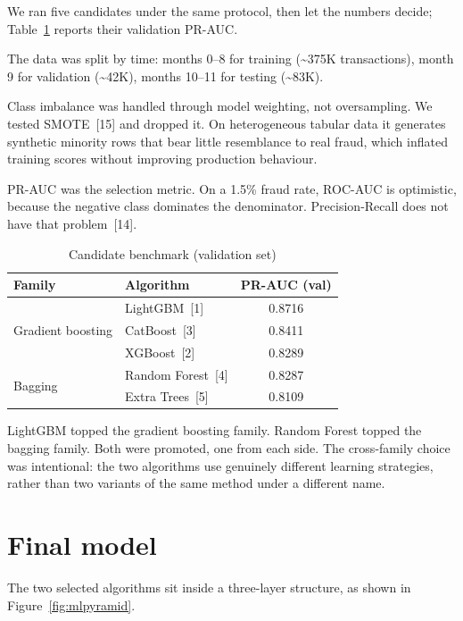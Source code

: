 \documentclass[12pt,a4paper]{report}
\begin{document}
We ran five candidates under the same protocol, then let the numbers decide; Table~\ref{tab:benchmark} reports their validation PR-AUC.

The data was split by time: months 0--8 for training (\textasciitilde375K transactions),
month 9 for validation (\textasciitilde42K), months 10--11 for testing
(\textasciitilde83K).

Class imbalance was handled through model weighting, not oversampling. We tested SMOTE~[15] and
dropped it. On heterogeneous tabular data it generates synthetic minority rows that bear little
resemblance to real fraud, which inflated training scores without improving production
behaviour.

PR-AUC was the selection metric. On a 1.5\% fraud rate, ROC-AUC is optimistic, because the
negative class dominates the denominator. Precision-Recall does not have that problem~[14].

\begin{table}[H]
\centering
\renewcommand{\arraystretch}{1.2}
\begin{tabular}{|l|l|c|}
\hline
\textbf{Family} & \textbf{Algorithm} & \textbf{PR-AUC (val)} \\
\hline
\multirow{3}{*}{Gradient boosting} & LightGBM~[1] & 0.8716 \\
\cline{2-3}
 & CatBoost~[3] & 0.8411 \\
\cline{2-3}
 & XGBoost~[2] & 0.8289 \\
\hline
\multirow{2}{*}{Bagging} & Random Forest~[4] & 0.8287 \\
\cline{2-3}
 & Extra Trees~[5] & 0.8109 \\
\hline
\end{tabular}
\caption{Candidate benchmark (validation set)}
\label{tab:benchmark}
\end{table}

LightGBM topped the gradient boosting family. Random Forest topped the bagging family. Both
were promoted, one from each side. The cross-family choice was intentional: the two algorithms use genuinely different learning strategies, rather than two variants of the same method under a different name.

\section{Final model}

The two selected algorithms sit inside a three-layer structure, as shown in Figure~\ref{fig:mlpyramid}.
\end{document}
